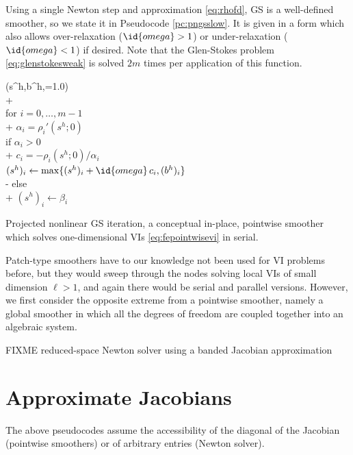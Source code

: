 \documentclass[letterpaper,final,12pt,reqno]{amsart}
\theoremstyle{claim}
\numberwithin{equation}{section}
\numberwithin{figure}{section}
\numberwithin{table}{section}
\numberwithin{theorem}{section}
\begin{document}
Using a single Newton step and approximation \eqref{eq:rhofd}, GS is a well-defined smoother, so we state it in Pseudocode \ref{pc:pngsslow}.  It is given in a form which also allows over-relaxation ($\id{omega} > 1$) or under-relaxation ($\id{omega} < 1$) if desired.  Note that the Glen-Stokes problem \eqref{eq:glenstokesweak} is solved $2m$ times per application of this function.

\begin{pcode}[ht]
\begin{pseudo*}
(s^h,b^h,=1.0)\text{:} \\+
     \\
    for $i = 0,\dots,m-1$ \\+
        $\alpha_i = \rho_i'(s^h; 0)$  \qquad\qquad {} \\
        if $\alpha_i > 0$ \\+
            $c_i = - \rho_i(s^h; 0) / \alpha_i$ \\
            $(s^h)_i \gets \max\{(s^h)_i + \id{omega}\,c_i, (b^h)_i\}$ \\-
        else \\+
            $(s^h)_i \gets \beta_i$ \qquad\qquad {}
\end{pseudo*}
\caption{Projected nonlinear GS iteration, a conceptual in-place, pointwise smoother which solves one-dimensional VIs \eqref{eq:fepointwisevi} in serial.}
\label{pc:pngsslow}
\end{pcode}

Patch-type smoothers \cite{Farrelletal2021} have to our knowledge not been used for VI problems before, but they would sweep through the nodes solving local VIs of small dimension $\ell>1$, and again there would be serial and parallel versions.  However, we first consider the opposite extreme from a pointwise smoother, namely a global smoother in which all the degrees of freedom are coupled together into an algebraic system.

FIXME reduced-space Newton solver using a banded Jacobian approximation


\section{Approximate Jacobians} \label{sec:jacobians}

The above pseudocodes assume the accessibility of the diagonal of the Jacobian (pointwise smoothers) or of arbitrary entries (Newton solver).
\end{document}
